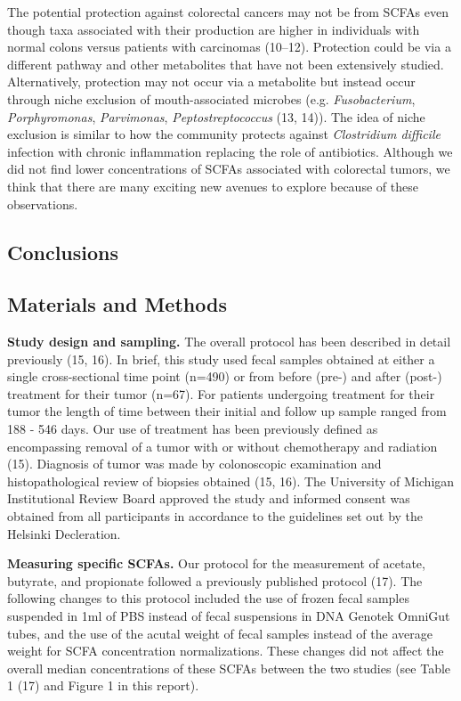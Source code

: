 \documentclass[11pt,]{article}
\begin{document}
The potential protection against colorectal cancers may not be from
SCFAs even though taxa associated with their production are higher in
individuals with normal colons versus patients with carcinomas (10--12).
Protection could be via a different pathway and other metabolites that
have not been extensively studied. Alternatively, protection may not
occur via a metabolite but instead occur through niche exclusion of
mouth-associated microbes (e.g. \emph{Fusobacterium},
\emph{Porphyromonas}, \emph{Parvimonas}, \emph{Peptostreptococcus} (13,
14)). The idea of niche exclusion is similar to how the community
protects against \emph{Clostridium difficile} infection with chronic
inflammation replacing the role of antibiotics. Although we did not find
lower concentrations of SCFAs associated with colorectal tumors, we
think that there are many exciting new avenues to explore because of
these observations.

\newpage

\subsection{Conclusions}\label{conclusions}

\newpage

\subsection{Materials and Methods}\label{materials-and-methods}

\textbf{Study design and sampling.} The overall protocol has been
described in detail previously (15, 16). In brief, this study used fecal
samples obtained at either a single cross-sectional time point (n=490)
or from before (pre-) and after (post-) treatment for their tumor
(n=67). For patients undergoing treatment for their tumor the length of
time between their initial and follow up sample ranged from 188 - 546
days. Our use of treatment has been previously defined as encompassing
removal of a tumor with or without chemotherapy and radiation (15).
Diagnosis of tumor was made by colonoscopic examination and
histopathological review of biopsies obtained (15, 16). The University
of Michigan Institutional Review Board approved the study and informed
consent was obtained from all participants in accordance to the
guidelines set out by the Helsinki Decleration.

\textbf{Measuring specific SCFAs.} Our protocol for the measurement of
acetate, butyrate, and propionate followed a previously published
protocol (17). The following changes to this protocol included the use
of frozen fecal samples suspended in 1ml of PBS instead of fecal
suspensions in DNA Genotek OmniGut tubes, and the use of the acutal
weight of fecal samples instead of the average weight for SCFA
concentration normalizations. These changes did not affect the overall
median concentrations of these SCFAs between the two studies (see Table
1 (17) and Figure 1 in this report).
\end{document}
